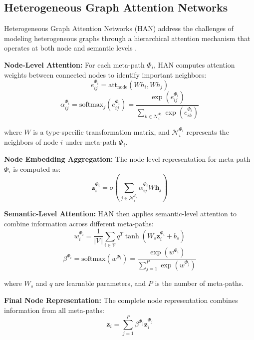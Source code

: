 \subsection{Heterogeneous Graph Attention Networks}


Heterogeneous Graph Attention Networks (HAN) address the challenges of modeling heterogeneous graphs through a hierarchical attention mechanism that operates at both node and semantic levels \cite{wang2019heterogeneous}.

\textbf{Node-Level Attention:} For each meta-path $\Phi_i$, HAN computes attention weights between connected nodes to identify important neighbors:
\begin{equation}
e_{ij}^{\Phi_i} = \text{att}_{\text{node}}(Wh_i, Wh_j)
\end{equation}
\begin{equation}
\alpha_{ij}^{\Phi_i} = \text{softmax}_j(e_{ij}^{\Phi_i}) = \frac{\exp(e_{ij}^{\Phi_i})}{\sum_{k \in \mathcal{N}_i^{\Phi_i}} \exp(e_{ik}^{\Phi_i})}
\end{equation}

where $W$ is a type-specific transformation matrix, and $\mathcal{N}_i^{\Phi_i}$ represents the neighbors of node $i$ under meta-path $\Phi_i$.

\textbf{Node Embedding Aggregation:} The node-level representation for meta-path $\Phi_i$ is computed as:
\begin{equation}
\mathbf{z}_i^{\Phi_i} = \sigma\left(\sum_{j \in \mathcal{N}_i^{\Phi_i}} \alpha_{ij}^{\Phi_i} W \mathbf{h}_j\right)
\end{equation}

\textbf{Semantic-Level Attention:} HAN then applies semantic-level attention to combine information across different meta-paths:
\begin{equation}
w_i^{\Phi_i} = \frac{1}{|\mathcal{V}|} \sum_{i \in \mathcal{V}} q^T \tanh(W_s \mathbf{z}_i^{\Phi_i} + b_s)
\end{equation}
\begin{equation}
\beta^{\Phi_i} = \text{softmax}(w^{\Phi_i}) = \frac{\exp(w^{\Phi_i})}{\sum_{j=1}^P \exp(w^{\Phi_j})}
\end{equation}

where $W_s$ and $q$ are learnable parameters, and $P$ is the number of meta-paths.

\textbf{Final Node Representation:} The complete node representation combines information from all meta-paths:
\begin{equation}
\mathbf{z}_i = \sum_{j=1}^P \beta^{\Phi_j} \mathbf{z}_i^{\Phi_j}
\end{equation}


